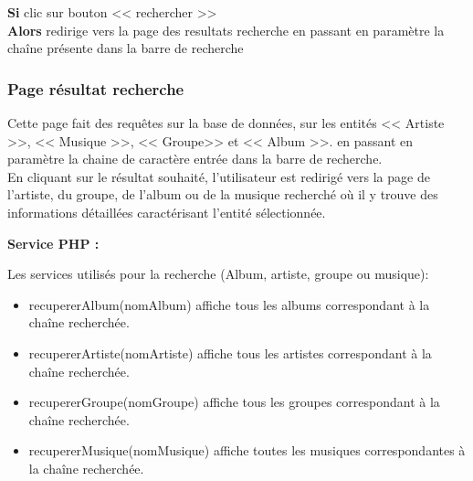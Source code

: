             \begin{paragraphe}
                \textbf{Si} clic sur bouton << rechercher >> \\
                \textbf{Alors} redirige vers la page des resultats recherche en passant en paramètre la chaîne présente dans la barre de recherche
            \end{paragraphe}


        \clearpage

		\subsubsection{Page résultat recherche}

			\begin{paragraphe}
				Cette page fait des requêtes sur la base de données, sur les entités << Artiste >>, << Musique >>, << Groupe>> et << Album >>.
				 en passant en paramètre la chaine de caractère entrée dans la barre de recherche.\\
                En cliquant sur le résultat souhaité, l'utilisateur est redirigé vers la page de l'artiste, du groupe, de l'album ou de la musique
                 recherché où il y trouve des informations détaillées caractérisant l'entité sélectionnée.
            \end{paragraphe}

            \begin{paragraphe}
                \textbf{Service PHP :}
            \end{paragraphe}

            \begin{paragraphe}
                Les services utilisés pour la recherche (Album, artiste, groupe ou musique):
                 \begin{itemize}
                     \item recupererAlbum(nomAlbum) affiche tous les albums correspondant à la chaîne recherchée.
                     \item recupererArtiste(nomArtiste) affiche tous les artistes correspondant à la chaîne recherchée.
                     \item recupererGroupe(nomGroupe) affiche tous les groupes correspondant à la chaîne recherchée.
                     \item recupererMusique(nomMusique) affiche toutes les musiques correspondantes à la chaîne recherchée.
                 \end{itemize}
             \end{paragraphe}

